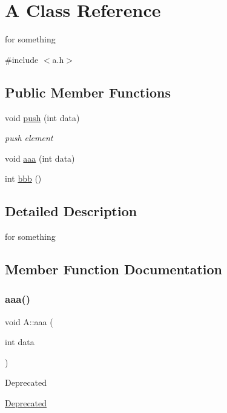 \hypertarget{classA}{}\section{A Class Reference}
\label{classA}


for something  




{\ttfamily \#include $<$a.\+h$>$}

\subsection*{Public Member Functions}
\begin{DoxyCompactItemize}
\item 
void \hyperlink{classA_af7bc5cf93b098b333d88a1d52080a604}{push} (int data)
\begin{DoxyCompactList}\small\item\em push element \end{DoxyCompactList}\item 
void \hyperlink{classA_a33fe9a1985d57557132d64c629a88924}{aaa} (int data)
\item 
int \hyperlink{classA_a2d59411fb75637b05d31775a4421b1cf}{bbb} ()
\end{DoxyCompactItemize}


\subsection{Detailed Description}
for something 



\subsection{Member Function Documentation}
\mbox{\label{classA_a33fe9a1985d57557132d64c629a88924}} 
\subsubsection{\texorpdfstring{aaa()}{aaa()}}
{\footnotesize\ttfamily void A\+::aaa (\begin{DoxyParamCaption}\item[{int}]{data }\end{DoxyParamCaption})}

\begin{DoxyRefDesc}{Deprecated}
\item[\hyperlink{deprecated__deprecated000001}{Deprecated}]\end{DoxyRefDesc}
\mbox{\label{classA_a2d59411fb75637b05d31775a4421b1cf}} 
